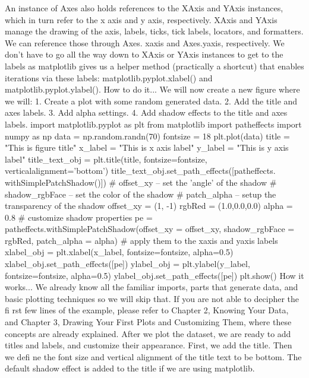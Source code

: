 An instance of Axes also holds references to the XAxis and YAxis instances, which in turn
refer to the x axis and y axis, respectively. XAxis and YAxis manage the drawing of the axis,
labels, ticks, tick labels, locators, and formatters. We can reference those through Axes.
xaxis and Axes.yaxis, respectively. We don't have to go all the way down to XAxis or
YAxis instances to get to the labels as matplotlib gives us a helper method (practically a
shortcut) that enables iterations via these labels: matplotlib.pyplot.xlabel() and
matplotlib.pyplot.ylabel().
How to do it...
We will now create a new figure where we will:
1. Create a plot with some random generated data.
2. Add the title and axes labels.
3. Add alpha settings.
4. Add shadow effects to the title and axes labels.
import matplotlib.pyplot as plt
from matplotlib import patheffects
import numpy as np
data = np.random.randn(70)
fontsize = 18
plt.plot(data)
title = "This is figure title"
x_label = "This is x axis label"
y_label = "This is y axis label"
title_text_obj = plt.title(title, fontsize=fontsize,
verticalalignment='bottom')
title_text_obj.set_path_effects([patheffects.
withSimplePatchShadow()])
# offset_xy -- set the 'angle' of the shadow
# shadow_rgbFace -- set the color of the shadow
# patch_alpha -- setup the transparency of the shadow
offset_xy = (1, -1)
rgbRed = (1.0,0.0,0.0)
alpha = 0.8
# customize shadow properties
pe = patheffects.withSimplePatchShadow(offset_xy = offset_xy,
 shadow_rgbFace = rgbRed,
 patch_alpha = alpha)
# apply them to the xaxis and yaxis labels
xlabel_obj = plt.xlabel(x_label, fontsize=fontsize, alpha=0.5)
xlabel_obj.set_path_effects([pe])
ylabel_obj = plt.ylabel(y_label, fontsize=fontsize, alpha=0.5)
ylabel_obj.set_path_effects([pe])
plt.show()
How it works...
We already know all the familiar imports, parts that generate data, and basic plotting
techniques so we will skip that. If you are not able to decipher the fi rst few lines of the
example, please refer to Chapter 2, Knowing Your Data, and Chapter 3, Drawing Your
First Plots and Customizing Them, where these concepts are already explained.
After we plot the dataset, we are ready to add titles and labels, and customize
their appearance.
First, we add the title. Then we defi ne the font size and vertical alignment of the title text to
be bottom. The default shadow effect is added to the title if we are using matplotlib.
